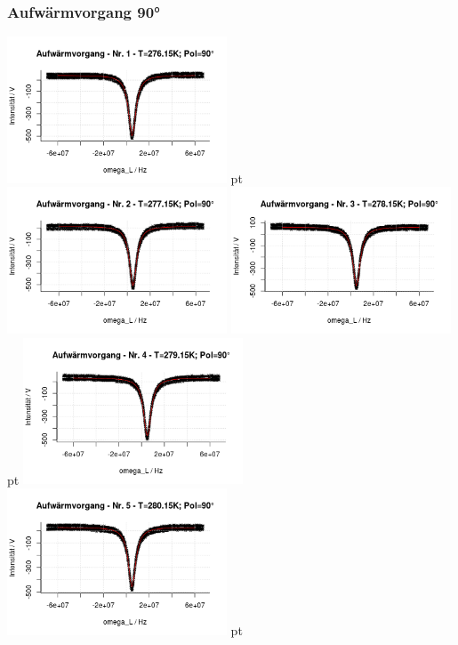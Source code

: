 \documentclass[12pt]{article}
\begin{document}
\subsubsection{Aufwärmvorgang 90°}
\begin{minipage}[h!]{\textwidth}
	\centering
	\includegraphics[width=0.49\textwidth]{figures/warm90-1.png} pt
	\includegraphics[width=0.49\textwidth]{figures/warm90-2.png}\vskip -10pt
	\includegraphics[width=0.49\textwidth]{figures/warm90-3.png} pt
	\includegraphics[width=0.49\textwidth]{figures/warm90-4.png}\vskip -10pt
	\includegraphics[width=0.49\textwidth]{figures/warm90-5.png} pt

\end{minipage}
\end{document}
